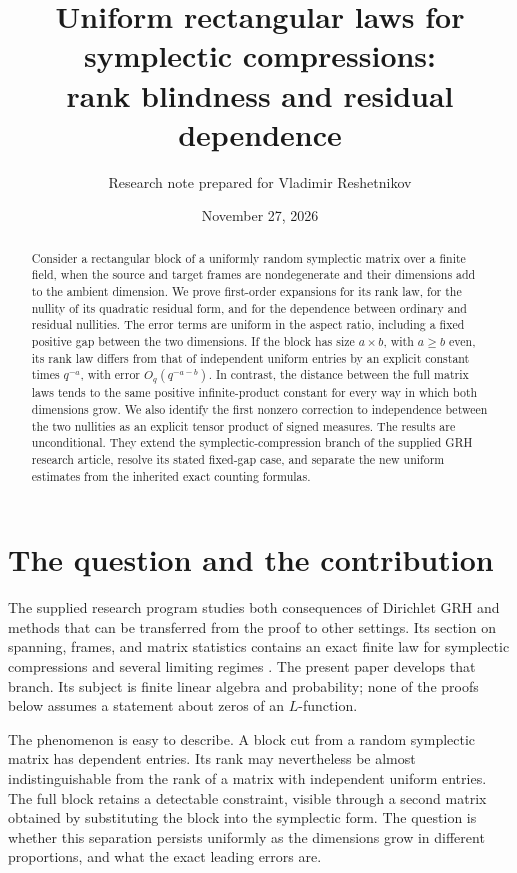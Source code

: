 \documentclass[11pt]{article}
\title{Uniform rectangular laws for symplectic compressions:\\
rank blindness and residual dependence}
\author{\small Research note prepared for Vladimir Reshetnikov}
\date{November 27, 2026}
\theoremstyle{definition}
\theoremstyle{remark}
\begin{document}
\maketitle

\begin{abstract}
Consider a rectangular block of a uniformly random symplectic matrix over a finite field, when the source and target frames are nondegenerate and their dimensions add to the ambient dimension. We prove first-order expansions for its rank law, for the nullity of its quadratic residual form, and for the dependence between ordinary and residual nullities. The error terms are uniform in the aspect ratio, including a fixed positive gap between the two dimensions. If the block has size $a\times b$, with $a\ge b$ even, its rank law differs from that of independent uniform entries by an explicit constant times $q^{-a}$, with error $O_q(q^{-a-b})$. In contrast, the distance between the full matrix laws tends to the same positive infinite-product constant for every way in which both dimensions grow. We also identify the first nonzero correction to independence between the two nullities as an explicit tensor product of signed measures. The results are unconditional. They extend the symplectic-compression branch of the supplied GRH research article, resolve its stated fixed-gap case, and separate the new uniform estimates from the inherited exact counting formulas.
\end{abstract}

\tableofcontents

\section{The question and the contribution}

The supplied research program studies both consequences of Dirichlet GRH and methods that can be transferred from the proof to other settings. Its section on spanning, frames, and matrix statistics contains an exact finite law for symplectic compressions and several limiting regimes \cite{ProveIt}. The present paper develops that branch. Its subject is finite linear algebra and probability; none of the proofs below assumes a statement about zeros of an $L$-function.

The phenomenon is easy to describe. A block cut from a random symplectic matrix has dependent entries. Its rank may nevertheless be almost indistinguishable from the rank of a matrix with independent uniform entries. The full block retains a detectable constraint, visible through a second matrix obtained by substituting the block into the symplectic form. The question is whether this separation persists uniformly as the dimensions grow in different proportions, and what the exact leading errors are.
\end{document}
